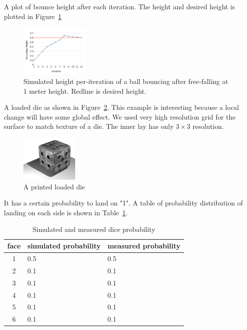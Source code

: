 \documentclass[annual]{acmsiggraph}
\begin{document}
A plot of bounce height after each iteration.
The height and desired height is plotted in Figure~\ref{fig:ball}
\begin{figure}
	\centering
 	\includegraphics[width=0.3\textwidth]{figure/ballHeight.pdf}
\caption{Simulated height per-iteration of a ball bouncing after free-falling at 1 meter height.
	Redline is desired height.}
\label{fig:ball}
\end{figure}


A loaded die as shown in Figure~\ref{fig:die}. This example is interesting because
a local change will have some global effect.
We used very high resolution grid for the surface to match texture
of a die. The inner lay has only $3\times 3$ resolution.
\begin{figure}
	\centering
 	\includegraphics[width=0.25\textwidth]{figure/die.png}
\caption{A printed loaded die}
\label{fig:die}
\end{figure}
It has a certain probability to land on "1".
A table of probability distribution of landing on each side
is shown in Table~\ref{tab:dice}.

\begin{table}
\centering
  \begin{tabular}{ |c| p{0.7in} | p{0.7in} | }
  \hline
  face & simulated probability & measured probability\\
  \hline
  1 & 0.5 & 0.5\\
  \hline
  2 & 0.1 & 0.1\\
  \hline
  3 & 0.1 & 0.1\\
  \hline
  4 & 0.1 & 0.1\\
  \hline
  5 & 0.1 & 0.1\\
  \hline
  6 & 0.1 & 0.1\\

  \hline
  \end{tabular}
  \caption{Simulated and measured dice probability}
  \label{tab:dice}
\end{table}
\end{document}
